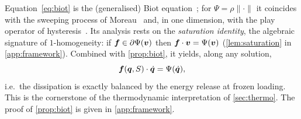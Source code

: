 Equation~\eqref{eq:biot} is the (generalised) Biot
equation~\cite{Biot1956}; for $\Psi=\rho\|\cdot\|$ it coincides with the
sweeping process of Moreau~\cite{moreau1977} and, in one dimension, with
the play operator of hysteresis~\cite{Krasnoselskii,visintin1994}. Its
analysis rests on the \emph{saturation identity}, the algebraic
signature of $1$-homogeneity: if $\bm{f}\in\partial\Psi(\bm{v})$ then
$\bm{f}\cdot\bm{v}=\Psi(\bm{v})$ (\cref{lem:saturation} in
\cref{app:framework}). Combined with \cref{prop:biot}, it yields, along
any solution,
\begin{equation}\label{eq:saturation_solution}
  \bm{f}(\bm{q},S)\cdot\dot{\bm{q}}=\Psi(\dot{\bm{q}}),
\end{equation}
i.e.\ the dissipation is exactly balanced by the energy release at
frozen loading. This is the cornerstone of the thermodynamic
interpretation of \cref{sec:thermo}. The proof of \cref{prop:biot} is
given in \cref{app:framework}.
